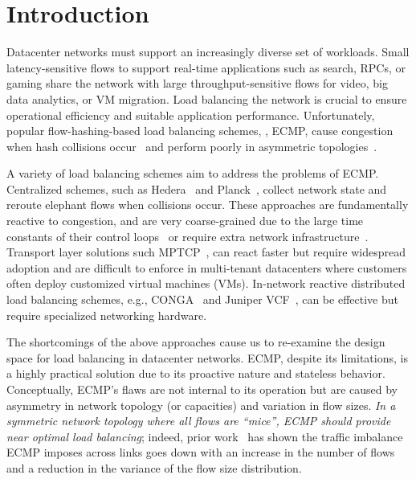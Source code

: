 \section{Introduction}
\label{section:intro}

Datacenter networks must support an increasingly diverse set of
workloads.
Small latency-sensitive flows to support real-time applications such
as search, RPCs, or gaming share the network with large
throughput-sensitive flows for video, big data analytics, or VM
migration.
Load balancing the network is crucial to ensure operational efficiency
and suitable application performance.
Unfortunately, popular flow-hashing-based load balancing schemes,
\eg{}, ECMP, cause congestion when hash collisions
occur~\cite{hedera,dc-mptcp,planck,vmware,detail,packetspray,drb} and
perform poorly in asymmetric topologies~\cite{conga,wcmp}.

A variety of load balancing schemes aim to address the
problems of ECMP.
Centralized schemes, such as Hedera~\cite{hedera} and
Planck~\cite{planck}, collect network state and reroute elephant flows
when collisions occur.
These approaches are fundamentally reactive to congestion, and are
very coarse-grained due to the large time constants of their control
loops~\cite{hedera} or require extra network
infrastructure~\cite{planck}.
Transport layer solutions such MPTCP~\cite{mptcp}, can
react faster but require widespread adoption and are difficult to
enforce in multi-tenant datacenters where customers often deploy
customized virtual machines (VMs).
In-network reactive distributed load balancing schemes, e.g.,
CONGA~\cite{conga} and Juniper VCF~\cite{juniper-vcf}, can be
effective but require specialized networking hardware.


The shortcomings of the above approaches cause us to re-examine the design space for load balancing in datacenter networks. ECMP, despite its limitations, is a highly practical solution due to its proactive nature and stateless behavior.
Conceptually, ECMP's flaws are not internal to its operation but are caused by asymmetry in network topology (or capacities) and variation in flow sizes. {\em In a symmetric network topology
where all flows are ``mice'', ECMP should provide near optimal load balancing}; indeed, prior work~\cite{conga,flowlet} has shown the traffic imbalance ECMP imposes across links goes down with an increase in the number of flows and a reduction in the variance of the flow size distribution. 


